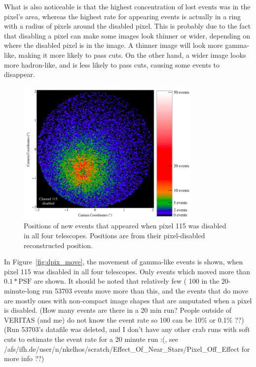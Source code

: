     What is also noticeable is that the highest concentration of lost events was in the pixel's area, whereas the highest rate for appearing events is actually in a ring with a radius of  pixels around the disabled pixel.
    This is probably due to the fact that disabling a pixel can make some images look thinner or wider, depending on where the disabled pixel is in the image.
    A thinner image will look more gamma-like, making it more likely to pass cuts.
    On the other hand, a wider image looks more hadron-like, and is less likely to pass cuts, causing some events to disappear.

    \begin{figure}[ht]
      \centering
      \includegraphics[width=0.8\textwidth]{images/disabled_pixel/appearing_events}
      \caption[Newly Appearing Events]{
        Positions of new events that appeared when pixel 115 was disabled in all four telescopes.
        Positions are from their pixel-disabled reconstructed position.
      }
      \label{fig:dpix_appear}
    \end{figure}

    In Figure~\ref{fig:dpix_move}, the movement of gamma-like events is shown, when pixel 115 was disabled in all four telescopes.
    Only events which moved more than $0.1*\text{PSF}$ are shown.
    It should be noted that relatively few ( {\color{red}\nicetilde{}100 in the 20-minute-long run 53703 events} move more than this, and the events that do move are mostly ones with non-compact image shapes that are amputated when a pixel is disabled.
    {\color{red}(How many events are there in a 20 min run? People outside of VERITAS (and me) do not know the event rate so 100 can be 10\% or 0.1\% ??)}
    {\color{red}(Run 53703's datafile was deleted, and I don't have any other crab runs with soft cuts to estimate the event rate for a 20 minute run :(, see /afs/ifh.de/user/n/nkelhos/scratch/Effect\_Of\_Near\_Stars/Pixel\_Off\_Effect for more info ??)}

